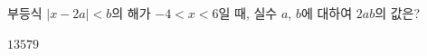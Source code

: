 부등식 $|x-2a|<b$의 해가 $-4<x<6$일 때, 실수 $a$, $b$에 대하여 $2ab$의 값은? 
\begin{choices32}{$1$}{$3$}{$5$}{$7$}{$9$}\end{choices32}
